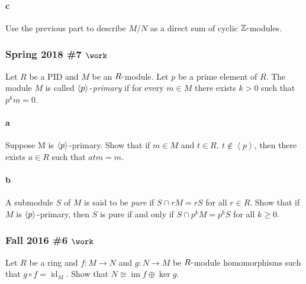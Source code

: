 \hypertarget{c-49}{%
\paragraph{c}\label{c-49}}

Use the previous part to describe \(M/N\) as a direct sum of cyclic
\({\mathbb{Z}}{\hbox{-}}\)modules.

\hypertarget{spring-2018-7-work}{%
\subsubsection{\texorpdfstring{Spring 2018 \#7
\(\work\)}{Spring 2018 \#7 \textbackslash work}}\label{spring-2018-7-work}}

Let \(R\) be a PID and \(M\) be an \(R{\hbox{-}}\)module. Let \(p\) be a
prime element of \(R\). The module \(M\) is called
\emph{\(\left\langle{p}\right\rangle{\hbox{-}}\)primary} if for every
\(m \in M\) there exists \(k > 0\) such that \(p^k m = 0\).

\hypertarget{a-86}{%
\paragraph{a}\label{a-86}}

Suppose M is \(\left\langle{p}\right\rangle{\hbox{-}}\)primary. Show
that if \(m \in M\) and
\(t \in R, ~t \not\in \left\langle{p}\right\rangle\), then there exists
\(a \in R\) such that \(atm = m\).

\hypertarget{b-76}{%
\paragraph{b}\label{b-76}}

A submodule \(S\) of \(M\) is said to be \emph{pure} if
\(S \cap r M = rS\) for all \(r \in R\). Show that if \(M\) is
\(\left\langle{p}\right\rangle{\hbox{-}}\)primary, then \(S\) is pure if
and only if \(S \cap p^k M = p^k S\) for all \(k \geq 0\).

\hypertarget{fall-2016-6-work}{%
\subsubsection{\texorpdfstring{Fall 2016 \#6
\(\work\)}{Fall 2016 \#6 \textbackslash work}}\label{fall-2016-6-work}}

Let \(R\) be a ring and \(f: M\to N\) and \(g: N\to M\) be
\(R{\hbox{-}}\)module homomorphisms such that
\(g\circ f = \operatorname{id}_M\). Show that
\(N\cong \operatorname{im}f \oplus \ker g\).

